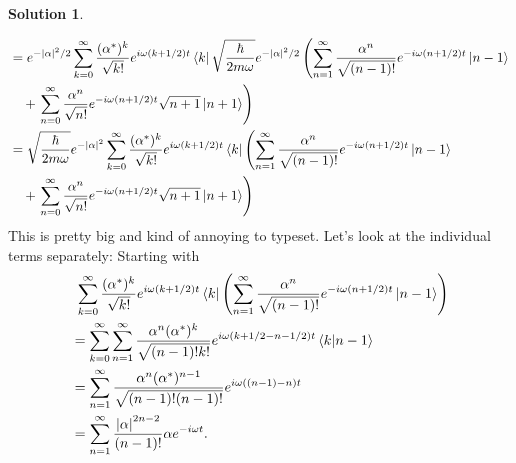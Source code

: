 \documentclass[10pt]{article}
\theoremstyle{definition}
\newtheorem{soln}{Solution}
\begin{document}
\begin{soln}
\begin{enumerate}[label=(\alph*)]
\begin{align*}
                                                       & =e^{-\abs{\alpha}^2/2}\sum_{k=0}^\infty\frac{(\alpha^*)^k}{\sqrt{k!}}e^{i\omega(k+1/2)t}\bra{k}\sqrt{\frac{\hbar}{2m\omega}}e^{-\abs{\alpha}^2/2}
            \left(\sum_{n=1}^\infty\frac{\alpha^n}{\sqrt{(n-1)!}}e^{-i\omega(n+1/2)t}\ket{n-1}\right.                                                                                                                                                                                                \\
                                                       & \quad+\left.\sum_{n=0}^\infty\frac{\alpha^n}{\sqrt{n!}}e^{-i\omega(n+1/2)t}\sqrt{n+1}\ket{n+1}\right)                                                                                                                                       \\
                                                       & =\sqrt{\frac{\hbar}{2m\omega}}e^{-\abs{\alpha}^2}\sum_{k=0}^\infty\frac{(\alpha^*)^k}{\sqrt{k!}}e^{i\omega(k+1/2)t}\bra{k}
            \left(\sum_{n=1}^\infty\frac{\alpha^n}{\sqrt{(n-1)!}}e^{-i\omega(n+1/2)t}\ket{n-1}\right.                                                                                                                                                                                                \\
                                                       & \quad+\left.\sum_{n=0}^\infty\frac{\alpha^n}{\sqrt{n!}}e^{-i\omega(n+1/2)t}\sqrt{n+1}\ket{n+1}\right)                                                                                                                                       \\
          \end{align*}
          This is pretty big and kind of annoying to typeset. Let's look at the individual terms separately:
          Starting with
          \begin{align*}
             & ~\sum_{k=0}^\infty\frac{(\alpha^*)^k}{\sqrt{k!}}e^{i\omega(k+1/2)t}\bra{k}
            \left(\sum_{n=1}^\infty\frac{\alpha^n}{\sqrt{(n-1)!}}e^{-i\omega(n+1/2)t}\ket{n-1}\right)                \\
             & =\sum_{k=0}^\infty
            \sum_{n=1}^\infty\frac{\alpha^{n}(\alpha^*)^k}{\sqrt{(n-1)!k!}}e^{i\omega(k+1/2-n-1/2)t}\bra{k}\ket{n-1} \\
             & =\sum_{n=1}^\infty\frac{\alpha^{n}(\alpha^*)^{n-1}}{\sqrt{(n-1)!(n-1)!}}e^{i\omega((n-1)-n)t}         \\
             & =\sum_{n=1}^\infty\frac{\abs{\alpha}^{2n-2}}{(n-1)!}\alpha e^{-i\omega t}.

\end{align*}
\end{enumerate}
\end{soln}
\end{document}
